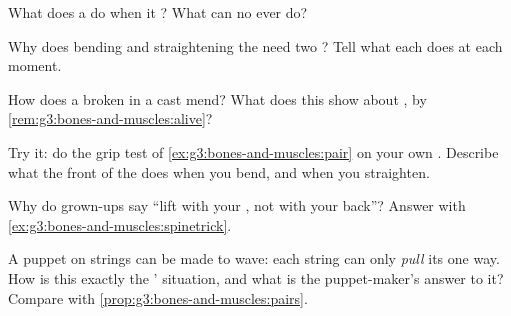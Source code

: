 \begin{exercise}[$\star$]\label{exo:g3:bones-and-muscles:5}
What does a  do when it ? What can no 
ever do?
\end{exercise}

\begin{exercise}[$\star$]\label{exo:g3:bones-and-muscles:6}
Why does bending and straightening the  need two ?
Tell what each does at each moment.
\end{exercise}

\begin{exercise}[$\star$]\label{exo:g3:bones-and-muscles:7}
How does a broken  in a cast mend? What does this show about
, by \cref{rem:g3:bones-and-muscles:alive}?
\end{exercise}

\begin{exercise}[$\star$]\label{exo:g3:bones-and-muscles:8}
Try it: do the grip test of \cref{ex:g3:bones-and-muscles:pair}
on your own . Describe what the front of the  does when
you bend, and when you straighten.
\end{exercise}

\begin{exercise}[$\star\star$]\label{exo:g3:bones-and-muscles:9}
Why do grown-ups say ``lift with your , not with your
back''? Answer with \cref{ex:g3:bones-and-muscles:spinetrick}.
\end{exercise}

\begin{exercise}[$\star\star$]\label{exo:g3:bones-and-muscles:10}
A puppet on strings can be made to wave: each string can only
\emph{pull} its  one way. How is this exactly the '
situation, and what is the puppet-maker's answer to it?
Compare with \cref{prop:g3:bones-and-muscles:pairs}.
\end{exercise}

